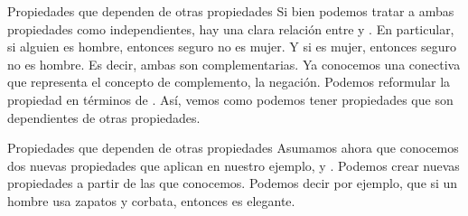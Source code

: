 


\begin{frame}{Propiedades que dependen de otras propiedades}
  Si bien podemos tratar a ambas propiedades como independientes,
  hay una clara relación entre  y .
  \jump
  En particular, si alguien es hombre, entonces seguro no es mujer. Y si es mujer,
  entonces seguro no es hombre. Es decir, ambas son complementarias.
  \jump
  Ya conocemos una conectiva que representa el concepto de complemento, la
  negación. Podemos reformular la propiedad  en términos
  de .
  \jump
  \jump
  Así, vemos como podemos tener propiedades que son dependientes de
  otras propiedades.
\end{frame}


\begin{frame}{Propiedades que dependen de otras propiedades}
  Asumamos ahora que conocemos dos nuevas propiedades que aplican en nuestro ejemplo,
   y .
  \jump
  Podemos crear nuevas propiedades a partir de las que conocemos. Podemos decir
  por ejemplo, que si un hombre usa zapatos y corbata, entonces es elegante.
  \jump
\end{frame}


